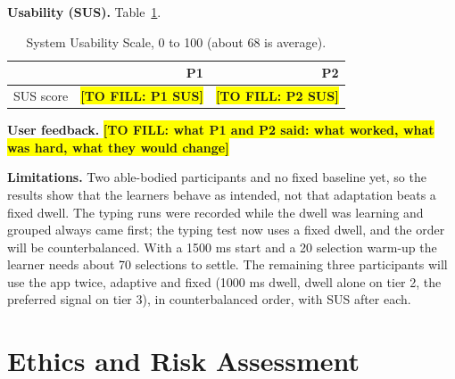 \documentclass[manuscript,review]{acmart}
\newcommand{\fillin}[1]{\colorbox{yellow}{\textbf{[TO FILL: #1]}}}
\begin{document}
\textbf{Usability (SUS).} Table~\ref{tab:sus}.

\begin{table}[h]
  \caption{System Usability Scale, 0 to 100 (about 68 is average).}
  \label{tab:sus}
  \small
  \begin{tabular}{lrr}
    \toprule
    & P1 & P2 \\
    \midrule
    SUS score & \fillin{P1 SUS} & \fillin{P2 SUS} \\
    \bottomrule
  \end{tabular}
\end{table}

\textbf{User feedback.} \fillin{what P1 and P2 said: what worked, what was hard, what they would
change}

\textbf{Limitations.} Two able-bodied participants and no fixed baseline yet, so the results show
that the learners behave as intended, not that adaptation beats a fixed dwell. The typing runs were
recorded while the dwell was learning and grouped always came first; the typing test now uses a
fixed dwell, and the order will be counterbalanced. With a 1500 ms start and a 20 selection
warm-up the learner needs about 70 selections to settle. The remaining three participants will use
the app twice, adaptive and fixed (1000 ms dwell, dwell alone on tier 2, the preferred signal on
tier 3), in counterbalanced order, with SUS after each.

\section{Ethics and Risk Assessment}
\end{document}
